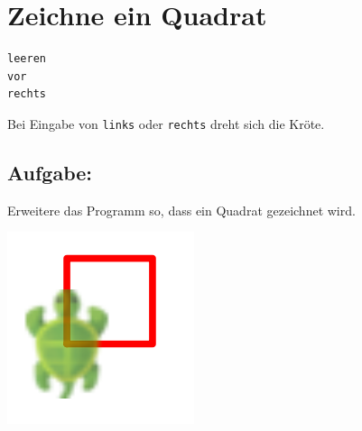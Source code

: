 \chapter{Zeichne ein Quadrat}
\begin{multicols}{2}

\begin{lstlisting}[basicstyle={\ttfamily\fontsize{30}{36}\selectfont},numbers=none]
leeren
vor
rechts
\end{lstlisting}
        
Bei Eingabe von \lstinline{links} oder \lstinline{rechts} dreht sich die Kröte.
\section*{\color{BrickRed}Aufgabe:}
Erweitere das Programm so, dass ein Quadrat gezeichnet wird.

\columnbreak

\begin{center}
\includegraphics{../img/square.png}
\end{center}

\end{multicols}

